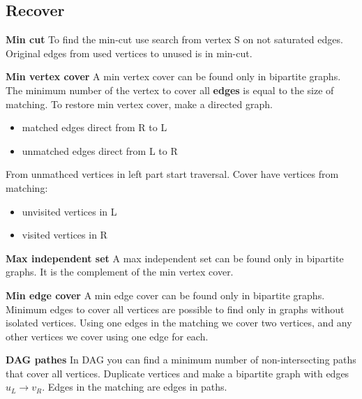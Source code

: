\subsection{Recover}
\textbf{Min cut}
To find the min-cut use search from vertex S on not saturated edges. 
Original edges from used vertices to unused is in min-cut.

\textbf{Min vertex cover}
A min vertex cover can be found only in bipartite graphs. 
The minimum number of the vertex to cover all \textbf{edges} is equal to the size of matching. 
To restore min vertex cover, make a directed graph.
\begin{itemize}
\setlength\itemsep{0em}
\item matched edges direct from R to L
\item unmatched edges direct from L to R
\end{itemize}

From unmathced vertices in left part start traversal.
Cover have vertices from matching:
\begin{itemize}
\setlength\itemsep{0em}
\item unvisited vertices in L 
\item visited vertices in R
\end{itemize}

\textbf{Max independent set}
A max independent set can be found only in bipartite graphs. 
It is the complement of the min vertex cover.

\textbf{Min edge cover}
A min edge cover can be found only in bipartite graphs. 
Minimum edges to cover all vertices are possible to find only in graphs without isolated vertices. 
Using one edges in the matching we cover two vertices, 
and any other vertices we cover using one edge for each. 

\textbf{DAG pathes}
In DAG you can find a minimum number of non-intersecting paths that cover all vertices. 
Duplicate vertices and make a bipartite graph with edges $u_L \rightarrow v_R$. 
Edges in the matching are edges in paths.

\bigskip 
